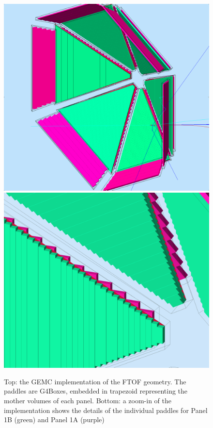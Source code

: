 \begin{figure}
	\centering
	\includegraphics[width=0.95\columnwidth,keepaspectratio]{img/ftofGeometry.png}
	\includegraphics[width=0.95\columnwidth,keepaspectratio]{img/ftofDetail.png}
	\caption{Top: the GEMC implementation of the FTOF geometry. The paddles are G4Boxes, embedded in trapezoid representing the mother volumes of each panel.
            Bottom: a zoom-in of the implementation shows the details of the individual paddles for Panel 1B (green) and Panel 1A (purple) }
	\label{fig:ftofGeometry}
\end{figure}

